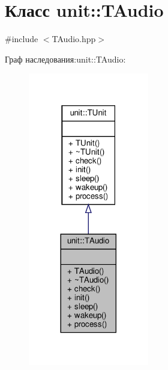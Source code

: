 \hypertarget{classunit_1_1_t_audio}{}\section{Класс unit\+:\+:T\+Audio}
\label{classunit_1_1_t_audio}


{\ttfamily \#include $<$T\+Audio.\+hpp$>$}



Граф наследования\+:unit\+:\+:T\+Audio\+:\nopagebreak
\begin{figure}[H]
\begin{center}
\leavevmode
\includegraphics[width=149pt]{classunit_1_1_t_audio__inherit__graph}
\end{center}
\end{figure}


